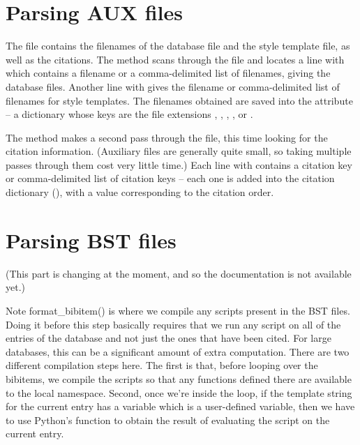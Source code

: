 \documentclass[letterpaper,10pt,english]{sphinxmanual}
\begin{document}
\section{Parsing AUX files}
\label{developer_guide:parsing-aux-files}
The  file contains the filenames of the  database file and the  style template file, as well as the citations. The  method scans through the  file and locates a line with  which contains a filename or a comma-delimited list of filenames, giving the database files. Another line with  gives the filename or comma-delimited list of filenames for style templates. The filenames obtained are saved into the  attribute -- a dictionary whose keys are the file extensions , , , , or .

The  method makes a second pass through the  file, this time looking for the citation information. (Auxiliary files are generally quite small, so taking multiple passes through them cost very little time.) Each line with  contains a citation key or comma-delimited list of citation keys -- each one is added into the citation dictionary (), with a value corresponding to the citation order.


\section{Parsing BST files}
\label{developer_guide:parsing-bst-files}
(This part is changing at the moment, and so the documentation is not available yet.)

Note format\_bibitem() is where we compile any scripts present in the BST files. Doing it before this step basically requires that we run any script on all of the entries of the database and not just the ones that have been cited. For large databases, this can be a significant amount of extra computation. There are two different compilation steps here. The first is that, before looping over the bibitems, we compile the scripts so that any functions defined there are available to the local namespace. Second, once we're inside the loop, if the template string for the current entry has a variable which is a user-defined variable, then we have to use Python's  function to obtain the result of evaluating the script on the current entry.
\end{document}
